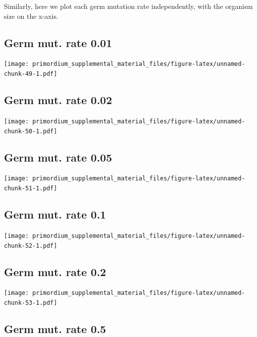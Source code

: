\documentclass[]{book}
\begin{document}
Similarly, here we plot each germ mutation rate independently, with the organism size on the x-axis.

\hypertarget{germ-mut.-rate-0.01}{%
\subsection{Germ mut. rate 0.01}\label{germ-mut.-rate-0.01}}

\texttt{[image: primordium\_supplemental\_material\_files/figure-latex/unnamed-chunk-49-1.pdf]}

\hypertarget{germ-mut.-rate-0.02}{%
\subsection{Germ mut. rate 0.02}\label{germ-mut.-rate-0.02}}

\texttt{[image: primordium\_supplemental\_material\_files/figure-latex/unnamed-chunk-50-1.pdf]}

\hypertarget{germ-mut.-rate-0.05}{%
\subsection{Germ mut. rate 0.05}\label{germ-mut.-rate-0.05}}

\texttt{[image: primordium\_supplemental\_material\_files/figure-latex/unnamed-chunk-51-1.pdf]}

\hypertarget{germ-mut.-rate-0.1}{%
\subsection{Germ mut. rate 0.1}\label{germ-mut.-rate-0.1}}

\texttt{[image: primordium\_supplemental\_material\_files/figure-latex/unnamed-chunk-52-1.pdf]}

\hypertarget{germ-mut.-rate-0.2}{%
\subsection{Germ mut. rate 0.2}\label{germ-mut.-rate-0.2}}

\texttt{[image: primordium\_supplemental\_material\_files/figure-latex/unnamed-chunk-53-1.pdf]}

\hypertarget{germ-mut.-rate-0.5}{%
\subsection{Germ mut. rate 0.5}\label{germ-mut.-rate-0.5}}
\end{document}
